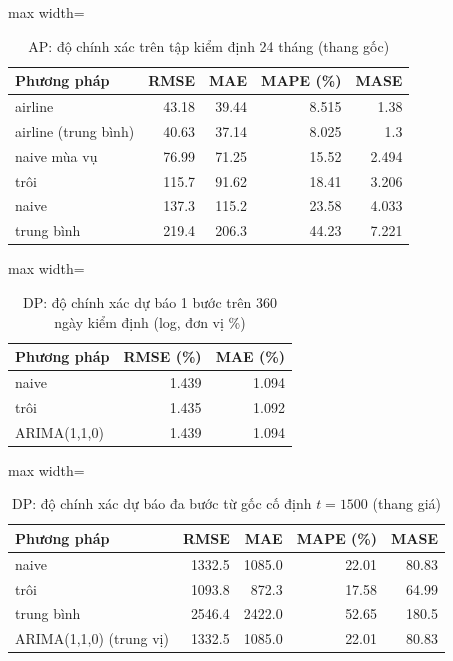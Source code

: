 \begin{table}[H]
\centering\footnotesize
\caption{AP: độ chính xác trên tập kiểm định 24 tháng (thang gốc)}\label{tab:tab_b12_11_ap_benchmarks}
\begin{adjustbox}{max width=\linewidth}
\begin{tabular}{|l|r|r|r|r|}
\toprule
Phương pháp & RMSE & MAE & MAPE (\%) & MASE \\
\midrule
airline & 43.18 & 39.44 & 8.515 & 1.38 \\
airline (trung bình) & 40.63 & 37.14 & 8.025 & 1.3 \\
naive mùa vụ & 76.99 & 71.25 & 15.52 & 2.494 \\
trôi & 115.7 & 91.62 & 18.41 & 3.206 \\
naive & 137.3 & 115.2 & 23.58 & 4.033 \\
trung bình & 219.4 & 206.3 & 44.23 & 7.221 \\
\bottomrule
\end{tabular}
\end{adjustbox}\par{}
\end{table}
\begin{table}[H]
\centering\footnotesize
\caption{DP: độ chính xác dự báo 1 bước trên 360 ngày kiểm định (log, đơn vị \%)}\label{tab:tab_b12_11_dp_one_step}
\begin{adjustbox}{max width=\linewidth}
\begin{tabular}{|l|r|r|}
\toprule
Phương pháp & RMSE (\%) & MAE (\%) \\
\midrule
naive & 1.439 & 1.094 \\
trôi & 1.435 & 1.092 \\
ARIMA(1,1,0) & 1.439 & 1.094 \\
\bottomrule
\end{tabular}
\end{adjustbox}
\end{table}
\begin{table}[H]
\centering\footnotesize
\caption{DP: độ chính xác dự báo đa bước từ gốc cố định $t=1500$ (thang giá)}\label{tab:tab_b12_11_dp_multistep}
\begin{adjustbox}{max width=\linewidth}
\begin{tabular}{|l|r|r|r|r|}
\toprule
Phương pháp & RMSE & MAE & MAPE (\%) & MASE \\
\midrule
naive & 1332.5 & 1085.0 & 22.01 & 80.83 \\
trôi & 1093.8 & 872.3 & 17.58 & 64.99 \\
trung bình & 2546.4 & 2422.0 & 52.65 & 180.5 \\
ARIMA(1,1,0) (trung vị) & 1332.5 & 1085.0 & 22.01 & 80.83 \\
\bottomrule
\end{tabular}
\end{adjustbox}
\end{table}
